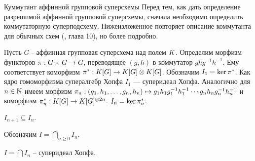 \begin{subsection}{Куммутант аффинной групповой суперсхемы}
  Перед тем, как дать определение разрешимой аффинной групповой суперсхемы,
  сначала необходимо определить коммутаторную суперподсхему. Нижеизложенное
  повторяет описание коммутанта для обычных схем (\cite{waterhouse}, глава 10),
  но более подробно.

  Пусть $ G $ - аффинная групповая суперсхема над полем $ K $.
  Определим морфизм функторов $ \pi: G \times G \to G $, переводящее
  $ (g, h) $ в коммутатор $ g h g^{-1} h^{-1} $. Ему соответствует коморфизм
  $ \pi^*: K[G] \to K[G] \otimes K[G] $. Обозначим $ I_1 = \ker\pi^* $.
  Как ядро гомоморфизма супералгебр Хопфа $ I_1 $ --- суперидеал Хопфа.
  Аналогично для $ n \in \mathbb{N} $ имеем морфизм
  $ \pi_n: (g_1, h_1, \ldots, g_n, h_n) \mapsto g_1 h_1 g_1^{-1} h_1^{-1} \cdots g_n h_n g_n^{-1} h_n^{-1} $
  и коморфизм $ \pi_n^*: K[G] \to K[G]^{\otimes 2n} $. $ I_n = \ker\pi_n^* $.

  \begin{proposition}
    $ I_{n+1} \subseteq I_{n} $.
  \end{proposition}

  Обозначим $ I = \bigcap_{n \geqslant 0} I_n $.

  \begin{proposition}
    $ I = \bigcap I_n $ -- суперидеал Хопфа.
\end{proposition}
\end{subsection}
